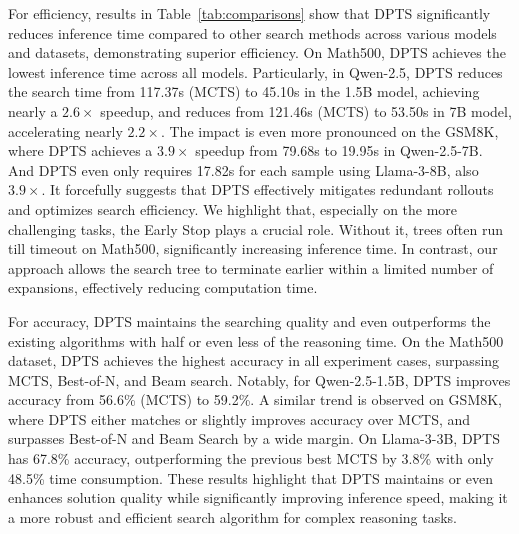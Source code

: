 For efficiency, results in Table~\ref{tab:comparisons} show that DPTS significantly reduces inference time compared to other search methods across various models and datasets, demonstrating superior efficiency. 
On Math500, DPTS achieves the lowest inference time across all models. Particularly, in Qwen-2.5, DPTS reduces the search time from 117.37s (MCTS) to 45.10s in the 1.5B model, achieving nearly a $2.6\times$ speedup, and reduces from 121.46s (MCTS) to 53.50s in 7B model, accelerating nearly $2.2\times$. 
The impact is even more pronounced on the GSM8K, where DPTS achieves a $3.9\times$ speedup from 79.68s to 19.95s in Qwen-2.5-7B. And DPTS even only requires 17.82s for each sample using Llama-3-8B, also $3.9\times$. It forcefully suggests that DPTS effectively mitigates redundant rollouts and optimizes search efficiency. 
We highlight that, especially on the more challenging tasks, the Early Stop plays a crucial role. Without it, trees often run till timeout on Math500, significantly increasing inference time. In contrast, our approach allows the search tree to terminate earlier within a limited number of expansions, effectively reducing computation time. 

For accuracy, DPTS maintains the searching quality and even outperforms the existing algorithms with half or even less of the reasoning time. 
On the Math500 dataset, DPTS achieves the highest accuracy in all experiment cases, surpassing MCTS, Best-of-N, and Beam search. Notably, for Qwen-2.5-1.5B, DPTS improves accuracy from 56.6\% (MCTS) to 59.2\%. 
A similar trend is observed on GSM8K, where DPTS either matches or slightly improves accuracy over MCTS, and surpasses Best-of-N and Beam Search by a wide margin. On Llama-3-3B, DPTS has 67.8\% accuracy, outperforming the previous best MCTS by 3.8\% with only 48.5\% time consumption. 
These results highlight that DPTS maintains or even enhances solution quality while significantly improving inference speed, making it a more robust and efficient search algorithm for complex reasoning tasks. 




